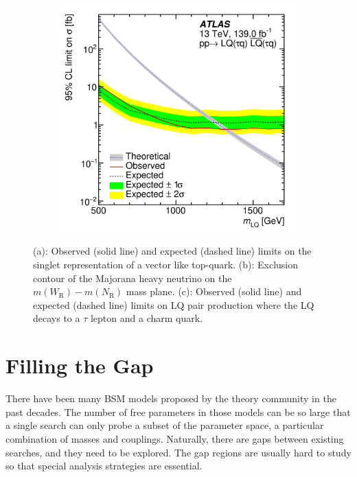 \documentclass{moriond}
\begin{document}
\begin{figure}[htp]
\begin{subfigure}[b]{0.25\textwidth}
         \centering
         \includegraphics[width=\textwidth]{excited}
         \caption{}
         \label{fig:excited}
     \end{subfigure}
     \caption{(a): Observed (solid line) and expected (dashed line) limits on the singlet representation of a vector like top-quark\protect\cite{vlq}. (b): Exclusion contour of the Majorana heavy neutrino on the $m(W_{\mathrm{R}})-m(N_{\mathrm{R}})$ mass plane\protect\cite{rhn}. (c): Observed (solid line) and expected (dashed line) limits on LQ pair production where the LQ decays to a $\tau$ lepton and a charm quark\protect\cite{tau}.}
     \label{fig:limits1}
\end{figure}

\section{Filling the Gap}

There have been many BSM models proposed by the theory community in the past
decades. The number of free parameters in those models can be so large that
a single search can only probe a subset of the parameter space, a particular
combination of masses and couplings. Naturally, there are gaps between existing
searches, and they need to be explored. The gap regions are usually hard to
study so that special analysis strategies are essential.\\
\end{document}
